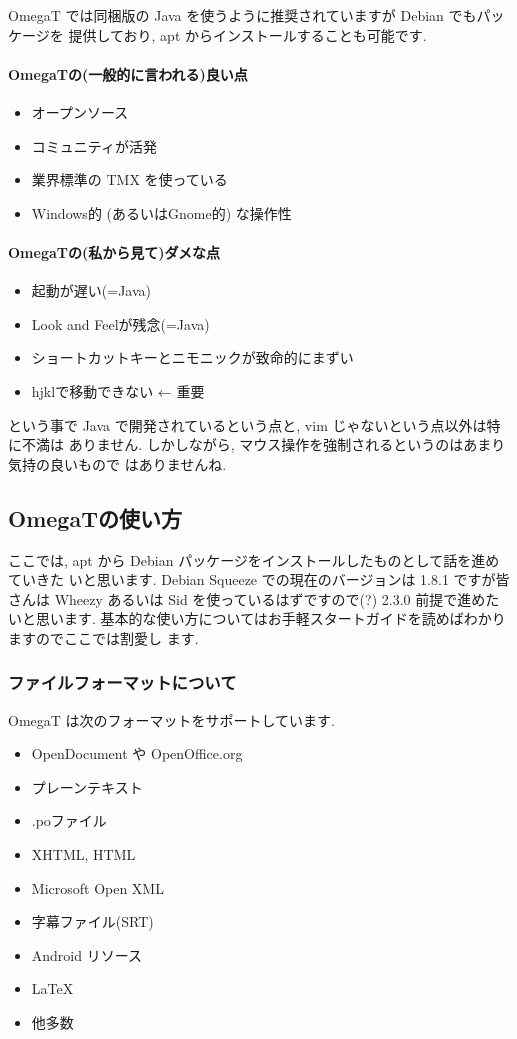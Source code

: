 \documentclass[mingoth,a4paper]{jsarticle}
\begin{document}
OmegaT では同梱版の Java を使うように推奨されていますが Debian でもパッケージを
提供しており, apt からインストールすることも可能です.

\paragraph{OmegaTの(一般的に言われる)良い点}
\begin{itemize}
	\item オープンソース
	\item コミュニティが活発
	\item 業界標準の TMX を使っている
	\item Windows的 (あるいはGnome的) な操作性
\end{itemize}

\paragraph{OmegaTの(私から見て)ダメな点}
\begin{itemize}
	\item 起動が遅い(=Java)
	\item Look and Feelが残念(=Java)
	\item ショートカットキーとニモニックが致命的にまずい
	\item hjklで移動できない ← 重要
\end{itemize}

という事で Java で開発されているという点と, vim じゃないという点以外は特に不満は
ありません. しかしながら, マウス操作を強制されるというのはあまり気持の良いもので
はありませんね.

\subsection{OmegaTの使い方}
ここでは, apt から Debian パッケージをインストールしたものとして話を進めていきた
いと思います. Debian Squeeze での現在のバージョンは 1.8.1 ですが皆さんは Wheezy
あるいは Sid を使っているはずですので(?) 2.3.0 前提で進めたいと思います.
基本的な使い方についてはお手軽スタートガイドを読めばわかりますのでここでは割愛し
ます.

\subsubsection{ファイルフォーマットについて}

OmegaT は次のフォーマットをサポートしています.
\begin{itemize}
	\item OpenDocument や OpenOffice.org
	\item プレーンテキスト
	\item .poファイル
	\item XHTML, HTML
	\item Microsoft Open XML
	\item 字幕ファイル(SRT)
	\item Android リソース
	\item LaTeX
	\item 他多数
\end{itemize}
\end{document}
